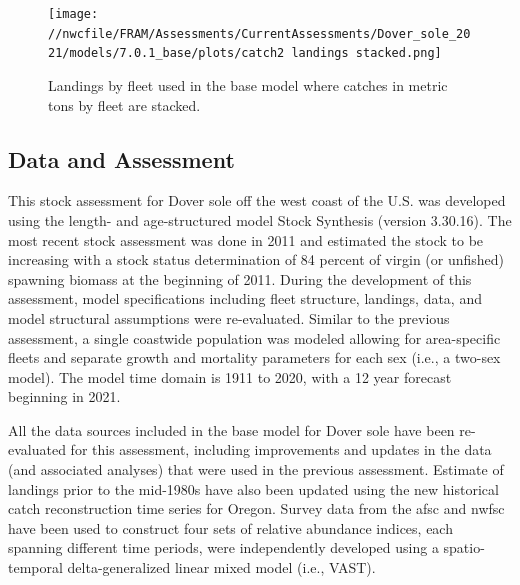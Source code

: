 \documentclass[11pt,
  english,
  a4paper,
]{article}
\begin{document}
\begin{figure}
\centering
\texttt{[image: //nwcfile/FRAM/Assessments/CurrentAssessments/Dover\_sole\_2021/models/7.0.1\_base/plots/catch2 landings stacked.png]}
\caption{Landings by fleet used in the base model where catches in metric tons by fleet are stacked.\label{fig:es-catch}}
\end{figure}

\tagmcend\tagstructend


\hypertarget{data-and-assessment}{%
\subsection*{Data and Assessment}\label{data-and-assessment}}

\leavevmode\tagmcend\tagstructend


This stock assessment for Dover sole off the west coast of the U.S. was developed using the length- and age-structured model Stock Synthesis (version 3.30.16). The most recent stock assessment was done in 2011 and estimated the stock to be increasing with a stock status determination of 84 percent of virgin (or unfished) spawning biomass at the beginning of 2011. During the development of this assessment, model specifications including fleet structure, landings, data, and model structural assumptions were re-evaluated. Similar to the previous assessment, a single coastwide population was modeled allowing for area-specific fleets and separate growth and mortality parameters for each sex (i.e., a two-sex model). The model time domain is 1911 to 2020, with a 12 year forecast beginning in 2021.

\leavevmode\tagmcend\tagstructend\par


All the data sources included in the base model for Dover sole have been re-evaluated for this assessment, including improvements and updates in the data (and associated analyses) that were used in the previous assessment. Estimate of landings prior to the mid-1980s have also been updated using the new historical catch reconstruction time series for Oregon. Survey data from the \gls{afsc} and \gls{nwfsc} have been used to construct four sets of relative abundance indices, each spanning different time periods, were independently developed using a spatio-temporal delta-generalized linear mixed model (i.e., VAST).
\end{document}
